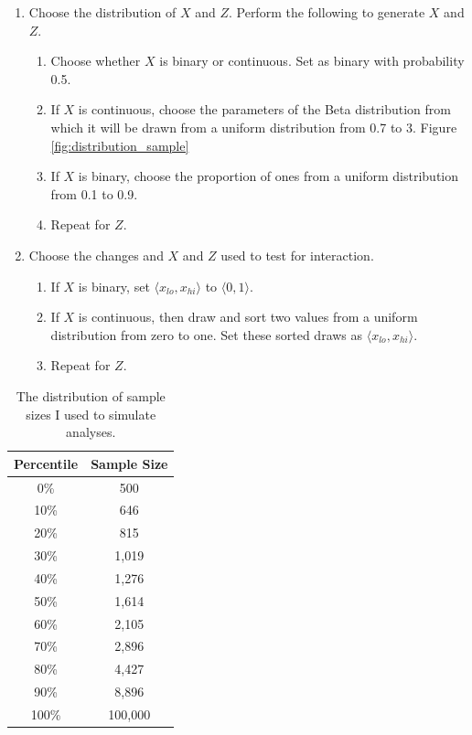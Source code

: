 \documentclass[12pt]{article}
\begin{document}
\begin{appendix}
\begin{enumerate}
        \item Choose the distribution of $X$ and $Z$. Perform the following to generate $X$ and $Z$.
                \begin{enumerate}
                \item Choose whether $X$ is binary or continuous. Set as binary with probability 0.5.
                \item If $X$ is continuous, choose the parameters of the Beta distribution from which it will be drawn from a uniform distribution from 0.7 to 3. Figure \ref{fig:distribution_sample}
                \item If $X$ is binary, choose the proportion of ones from a uniform distribution from 0.1 to 0.9.
                \item Repeat for $Z$.
                \end{enumerate}
                
        \item Choose the changes and $X$ and $Z$ used to test for interaction.
                \begin{enumerate}
                \item If $X$ is binary, set $\langle x_{lo}, x_{hi} \rangle$ to $\langle 0, 1 \rangle$.
                \item If $X$ is continuous, then draw and sort two values from a uniform distribution from zero to one. Set these sorted draws as $\langle x_{lo}, x_{hi} \rangle$.
                \item Repeat for $Z$.
                \end{enumerate}
\end{enumerate}


\begin{table}[h]
\begin{center}
\begin{tabular}{|cc|}
\hline
Percentile & Sample Size \\ 
\hline
0\% & 500 \\ 
10\% & 646 \\ 
20\% & 815 \\ 
30\% & 1,019 \\ 
40\% & 1,276 \\ 
50\% & 1,614 \\ 
60\% & 2,105 \\ 
70\% & 2,896 \\ 
80\% & 4,427 \\ 
90\% & 8,896 \\ 
100\% & 100,000 \\ 
\hline
\end{tabular}\caption{The distribution of sample sizes I used to simulate analyses.}\label{tab:n}
\end{center}
\end{table}     


\end{appendix}
\end{document}
